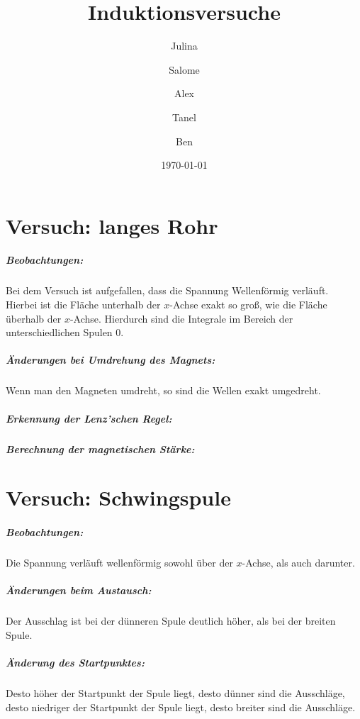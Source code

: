 \documentclass[a4paper, 12pt]{report}
\begin{document}
	\title{Induktionsversuche}
	\date{\today}
	\author{Julina \and Salome \and Alex \and Tanel \and Ben}
	\maketitle
	\bsremovechaptertitle
	\noindent
	\tableofcontents
	\chapter{Versuch: langes Rohr}
	\paragraph{Beobachtungen:}
	Bei dem Versuch ist aufgefallen, dass die Spannung Wellenförmig verläuft.
	Hierbei ist die Fläche unterhalb der $x$-Achse exakt so groß, wie die Fläche überhalb der $x$-Achse.
	Hierdurch sind die Integrale im Bereich der unterschiedlichen Spulen $0$.
	\paragraph{Änderungen bei Umdrehung des Magnets:}
	Wenn man den Magneten umdreht, so sind die Wellen exakt umgedreht.
	\paragraph{Erkennung der Lenz'schen Regel:}
	\paragraph{Berechnung der magnetischen Stärke:}
	\chapter{Versuch: Schwingspule}
	\paragraph{Beobachtungen:} Die Spannung verläuft wellenförmig sowohl über der $x$-Achse, als auch darunter.
	\paragraph{Änderungen beim Austausch:}
	Der Ausschlag ist bei der dünneren Spule deutlich höher, als bei der breiten Spule.
	\paragraph{Änderung des Startpunktes:}
	Desto höher der Startpunkt der Spule liegt, desto dünner sind die Ausschläge, desto niedriger der Startpunkt der Spule liegt, desto breiter sind die Ausschläge.
\end{document}
